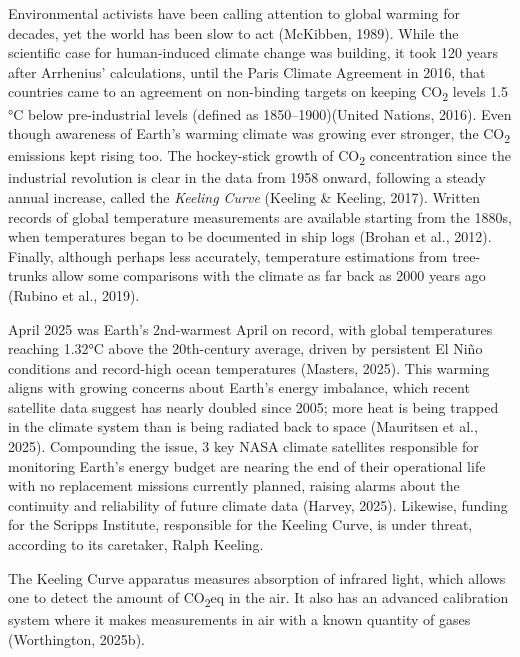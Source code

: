 \documentclass[
  12pt,
  letterpaper,
  DIV=11,
  numbers=noendperiod]{scrartcl}
\begin{document}
Environmental activists have been calling attention to global warming
for decades, yet the world has been slow to act (McKibben, 1989). While
the scientific case for human-induced climate change was building, it
took 120 years after Arrhenius' calculations, until the Paris Climate
Agreement in 2016, that countries came to an agreement on non-binding
targets on keeping CO\textsubscript{2} levels 1.5 °C below
pre-industrial levels (defined as 1850--1900)(United Nations, 2016).
Even though awareness of Earth's warming climate was growing ever
stronger, the CO\textsubscript{2} emissions kept rising too. The
hockey-stick growth of CO\textsubscript{2} concentration since the
industrial revolution is clear in the data from 1958 onward, following a
steady annual increase, called the \emph{Keeling Curve} (Keeling \&
Keeling, 2017). Written records of global temperature measurements are
available starting from the 1880s, when temperatures began to be
documented in ship logs (Brohan et al., 2012). Finally, although perhaps
less accurately, temperature estimations from tree-trunks allow some
comparisons with the climate as far back as 2000 years ago (Rubino et
al., 2019).

April 2025 was Earth's 2nd-warmest April on record, with global
temperatures reaching 1.32°C above the 20th-century average, driven by
persistent El Niño conditions and record-high ocean temperatures
(Masters, 2025). This warming aligns with growing concerns about Earth's
energy imbalance, which recent satellite data suggest has nearly doubled
since 2005; more heat is being trapped in the climate system than is
being radiated back to space (Mauritsen et al., 2025). Compounding the
issue, 3 key NASA climate satellites responsible for monitoring Earth's
energy budget are nearing the end of their operational life with no
replacement missions currently planned, raising alarms about the
continuity and reliability of future climate data (Harvey, 2025).
Likewise, funding for the Scripps Institute, responsible for the Keeling
Curve, is under threat, according to its caretaker, Ralph Keeling.

The Keeling Curve apparatus measures absorption of infrared light, which
allows one to detect the amount of CO\textsubscript{2}eq in the air. It
also has an advanced calibration system where it makes measurements in
air with a known quantity of gases (Worthington, 2025b).
\end{document}

